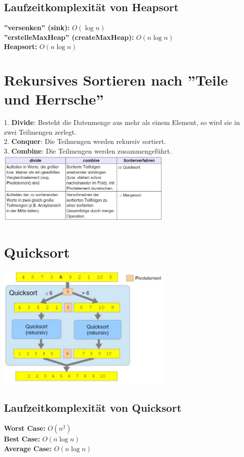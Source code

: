 \documentclass{scrreprt}
\begin{document}
\subsection{Laufzeitkomplexität von Heapsort}
\textbf{''versenken'' (sink):} $O(\log n)$
\\\textbf{''erstelleMaxHeap'' (createMaxHeap):} $O(n \log n)$
\\\textbf{Heapsort:} $O(n \log n)$
\section{Rekursives Sortieren nach ''Teile und Herrsche''}
1. \textbf{Divide}: Besteht die Datenmenge aus mehr als einem Element, so wird sie in zwei Teilmengen zerlegt.
\\2. \textbf{Conquer}: Die Teilmengen werden rekursiv sortiert.
\\3. \textbf{Combine}: Die Teilmengen werden zusammengeführt.
\\\includegraphics[width=0.65\textwidth]{graphics/sort-table}
\section{Quicksort}
\includegraphics[width=0.65\textwidth]{graphics/Quicksort}
\subsection{Laufzeitkomplexität von Quicksort}
\textbf{Worst Case:} $O(n^2)$
\\\textbf{Best Case:} $O(n \log n)$
\\\textbf{Average Case:} $O(n \log n)$
\end{document}
